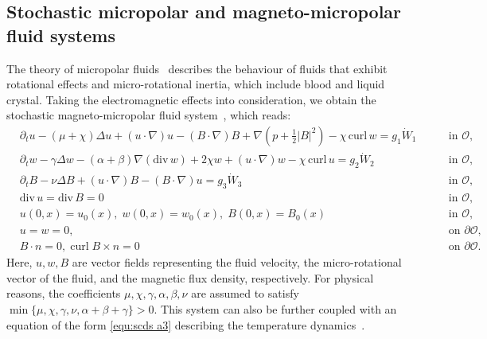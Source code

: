 \documentclass[11pt, reqno]{amsart}
\theoremstyle{definition}
\numberwithin{equation}{section}
\newcommand{\divg}{\mathrm{div}\,}
\newcommand{\curl}{\mathrm{curl}\,}
\newcommand{\abs}[1]{\left|{#1}\right|}
\begin{document}
\subsection{Stochastic micropolar and magneto-micropolar fluid systems}\label{sec:mmp}

The theory of micropolar fluids~\cite{Eri66} describes the behaviour of fluids that exhibit rotational effects and micro-rotational inertia, which include blood and liquid crystal. Taking the electromagnetic effects into consideration, we obtain the stochastic magneto-micropolar fluid system~\cite{InoMatOta03, Yam14, Yam16m}, which reads:
\begin{subequations}\label{equ:smmf}
	\begin{alignat}{2}
		&\partial_t u - (\mu+\chi) \Delta u + (u\cdot\nabla)u - (B\cdot\nabla) B + \nabla \left(p+\frac12 \abs{B}^2\right) - \chi \,\curl w= g_1 \dot{W}_1
		\; && \quad\text{in $\mathscr{O}$,}
		\label{equ:smmf a1}
        \\[1ex]
        \label{equ:smmf a2}
        &\partial_t w - \gamma \Delta w - (\alpha+\beta)\nabla(\divg w) + 2\chi w + (u\cdot\nabla)w - \chi \,\curl u = g_2 \dot{W}_2
        \; && \quad\text{in $\mathscr{O}$,}
		\\[1ex]
        \label{equ:smmf a3}
        &\partial_t B - \nu \Delta B + (u\cdot\nabla)B - (B\cdot\nabla)u = g_3\dot{W}_3
        \; && \quad\text{in $\mathscr{O}$,}
        \\[1ex]
		&\divg u = \divg B= 0
		\; && \quad\text{in $\mathscr{O}$,}
		\label{equ:smmf b}
		\\[1ex]
		&u(0,x)= u_0(x),\; w(0,x)=w_0(x), \; B(0,x)= B_0(x)
		\; && \quad\text{in $\mathscr{O}$,}
		\label{equ:smmf c}
		\\[1ex]
		&u = w = 0,
		\; && \quad\text{on $\partial\mathscr{O}$,}
		\label{equ:smmf d}
        \\[1ex]
        \label{equ:smmf e}
        &B\cdot n=0, \; \mathrm{curl}\; B\times n=0
        \; && \quad \text{on $\partial\mathscr{O}$.}
	\end{alignat}
\end{subequations}
Here, $u,w,B$ are vector fields representing the fluid velocity, the micro-rotational vector of the fluid, and the magnetic flux density, respectively. For physical reasons, the coefficients $\mu, \chi,\gamma,\alpha,\beta,\nu$ are assumed to satisfy $\min\{\mu,\chi,\gamma,\nu,\alpha+\beta+\gamma\} >0$. This system can also be further coupled with an equation of the form \eqref{equ:scds a3} describing the temperature dynamics~\cite{KalLanLuk19, XuQiaZha21}.
\end{document}
